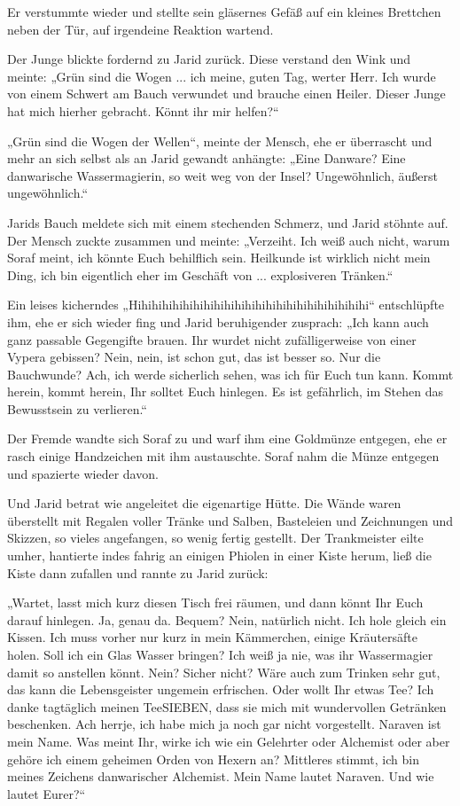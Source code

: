 Er verstummte wieder und stellte sein gläsernes Gefäß auf ein kleines Brettchen neben der Tür, auf irgendeine Reaktion wartend.

Der Junge blickte fordernd zu Jarid zurück. Diese verstand den Wink und meinte: „Grün sind die Wogen ... ich meine, guten Tag, werter Herr. Ich wurde von einem Schwert am Bauch verwundet und brauche einen Heiler. Dieser Junge hat mich hierher gebracht. Könnt ihr mir helfen?“

„Grün sind die Wogen der Wellen“, meinte der Mensch, ehe er überrascht und mehr an sich selbst als an Jarid gewandt anhängte: „Eine Danware? Eine danwarische Wassermagierin, so weit weg von der Insel? Ungewöhnlich, äußerst ungewöhnlich.“

Jarids Bauch meldete sich mit einem stechenden Schmerz, und Jarid stöhnte auf. Der Mensch zuckte zusammen und meinte: „Verzeiht. Ich weiß auch nicht, warum Soraf meint, ich könnte Euch behilflich sein. Heilkunde ist wirklich nicht mein Ding, ich bin eigentlich eher im Geschäft von ... explosiveren Tränken.“

Ein leises kicherndes „Hihihihihihihihihihihihihihihihihihihihihihihi“ entschlüpfte ihm, ehe er sich wieder fing und Jarid beruhigender zusprach: „Ich kann auch ganz passable Gegengifte brauen. Ihr wurdet nicht zufälligerweise von einer Vypera gebissen? Nein, nein, ist schon gut, das ist besser so. Nur die Bauchwunde? Ach, ich werde sicherlich sehen, was ich für Euch tun kann. Kommt herein, kommt herein, Ihr solltet Euch hinlegen. Es ist gefährlich, im Stehen das Bewusstsein zu verlieren.“

Der Fremde wandte sich Soraf zu und warf ihm eine Goldmünze entgegen, ehe er rasch einige Handzeichen mit ihm austauschte. Soraf nahm die Münze entgegen und spazierte wieder davon.

Und Jarid betrat wie angeleitet die eigenartige Hütte. Die Wände waren überstellt mit Regalen voller Tränke und Salben, Basteleien und Zeichnungen und Skizzen, so vieles angefangen, so wenig fertig gestellt. Der Trankmeister eilte umher, hantierte indes fahrig an einigen Phiolen in einer Kiste herum, ließ die Kiste dann zufallen und rannte zu Jarid zurück:

„Wartet, lasst mich kurz diesen Tisch frei räumen, und dann könnt Ihr Euch darauf hinlegen. Ja, genau da. Bequem? Nein, natürlich nicht. Ich hole gleich ein Kissen. Ich muss vorher nur kurz in mein Kämmerchen, einige Kräutersäfte holen. Soll ich ein Glas Wasser bringen? Ich weiß ja nie, was ihr Wassermagier damit so anstellen könnt. Nein? Sicher nicht? Wäre auch zum Trinken sehr gut, das kann die Lebensgeister ungemein erfrischen. Oder wollt Ihr etwas Tee? Ich danke tagtäglich meinen TeeSIEBEN, dass sie mich mit wundervollen Getränken beschenken. Ach herrje, ich habe mich ja noch gar nicht vorgestellt. Naraven ist mein Name. Was meint Ihr, wirke ich wie ein Gelehrter oder Alchemist oder aber gehöre ich einem geheimen Orden von Hexern an? Mittleres stimmt, ich bin meines Zeichens danwarischer Alchemist. Mein Name lautet Naraven. Und wie lautet Eurer?“

